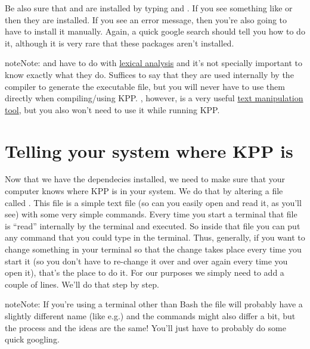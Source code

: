 \documentclass[letterpaper,10pt,openany,oneside]{sphinxmanual}
\begin{document}
Be also sure that  and  are installed by typing 
and . If you see something like  or
 then they are installed. If you see an error message, then
you're also going to have to install it manually. Again, a quick google search
should tell you how to do it, although it is very rare that these packages
aren't installed.

\begin{notice}{note}{Note:}
 and  have to do with \href{https://en.wikipedia.org/wiki/Lexical\_analysis}{lexical analysis}
and it's not specially important to know exactly what they do. Suffices to
say that they are used internally by the compiler to generate the executable
file, but you will never have to use them directly when compiling/using KPP.
, however, is a very useful \href{https://en.wikipedia.org/wiki/Sed}{text manipulation tool},
but you also won't need to use it
while running KPP.
\end{notice}


\section{Telling your system where KPP is}
\label{compiling:telling-your-system-where-kpp-is}
Now that we have the dependecies installed, we need to make sure that your
computer knows where KPP is in your system. We do that by altering a file
called . This file is a simple text file (so can you easily open and
read it, as you'll see) with some very simple commands. Every time you start a
terminal that file is ``read'' internally by the terminal and executed. So inside
that file you can put any command that you could type in the terminal. Thus,
generally, if you want to change something in your terminal so that the change
takes place every time you start it (so you don't have to re-change it over and
over again every time you open it), that's the place to do it. For our purposes
we simply need to add a couple of lines. We'll do that step by step.

\begin{notice}{note}{Note:}
If you're using a terminal other than Bash the  file will probably
have a slightly different name (like  e.g.) and the commands might
also differ a bit, but the process and the ideas are the same! You'll just have
to probably do some quick googling.
\end{notice}
\end{document}
